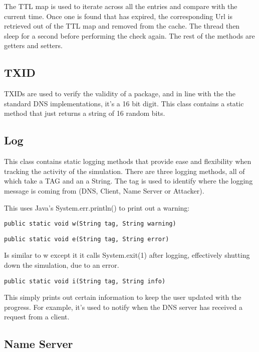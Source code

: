 \documentclass[a4paper, 12pt]{article} %
\begin{document}
The TTL map is used to iterate across all the entries and compare with the current time. Once one is found that has expired, the corresponding Url is retrieved out of the TTL map and removed from the cache. The thread then sleep for a second before performing the check again. The rest of the methods are getters and setters. 

\subsection*{TXID}

TXIDs are used to verify the validity of a package, and in line with the the standard DNS implementations, it's a 16 bit digit. This class contains a static method that just returns a string of 16 random bits.  

\subsection*{Log}

This class contains static logging methods that provide ease and flexibility when tracking the activity of the simulation. There are three logging methods, all of which take a TAG and an a String. The tag is used to identify where the logging message is coming from (DNS, Client, Name Server or Attacker).

This uses Java's System.err.println() to print out a warning:

\begin{lstlisting}
public static void w(String tag, String warning)
\end{lstlisting}

\begin{lstlisting}
public static void e(String tag, String error) 
\end{lstlisting}

Is similar to w except it it calls System.exit(1) after logging, effectively shutting down the simulation, due to an error. 
\begin{lstlisting}
public static void i(String tag, String info) 
\end{lstlisting}

This simply prints out certain information to keep the user updated with the progress. For example, it's used to notify when the DNS server has received a request from a client. 


\subsection*{Name Server}
\end{document}
